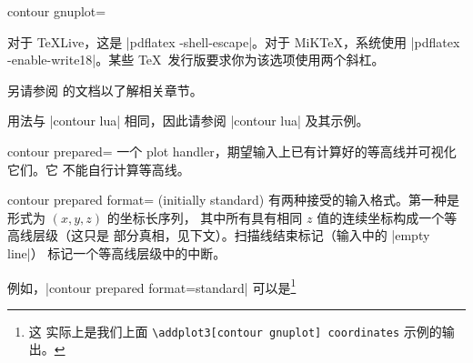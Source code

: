 {{\begin{plottype}[/pgfplots]{
    contour gnuplot=\textcolor{black}{}%
}
\begin{enumerate}
        对于 \TeX{}Live，这是 |pdflatex -shell-escape|。对于 MiK\TeX{}，系统使用 |pdflatex -enable-write18|。某些 \TeX\ 发行版要求你为该选项使用两个斜杠。
\end{enumerate}
	另请参阅  的文档以了解相关章节。



	用法与 |contour lua| 相同，因此请参阅 |contour lua| 及其示例。

\pgfplotsexpensiveexample
\begin{codeexample}[]
\end{codeexample}

\pgfplotsexpensiveexample
\begin{codeexample}[]
\end{codeexample}
\end{plottype}

\begin{plottype}[/pgfplots]{contour prepared=\textcolor{black}{}}
    一个 plot handler，期望输入上已有计算好的等高线并可视化它们。它
    不能自行计算等高线。

    \begin{pgfplotskey}{contour prepared format= (initially standard)}
        有两种接受的输入格式。第一种是形式为 $(x,y,z)$ 的坐标长序列，
        其中所有具有相同 $z$ 值的连续坐标构成一个等高线层级（这只是
        部分真相，见下文）。扫描线结束标记（输入中的 |empty line|）
        标记一个等高线层级中的中断。

        例如，|contour prepared format=standard| 可以是\footnote{这
        实际上是我们上面 \texttt{\textbackslash addplot3[contour
        gnuplot] coordinates} 示例的输出。}
\begin{codeexample}[]
\end{codeexample}
\end{pgfplotskey}
\end{plottype}}}
